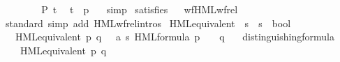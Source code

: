 \begin{isabellebody}
\ \ \ \ \isamarkupfalse%
\isanewline
\ \ \isamarkupfalse%
\ {\isacartoucheopen}P\ t{\isacartoucheclose}\ \isamarkupfalse%
\ {\isacartoucheopen}t\ {\isacharequal}{\kern0pt}\ {\isacharparenleft}{\kern0pt}p{\isacharcomma}{\kern0pt}\ {\isasymphi}{\isacharparenright}{\kern0pt}{\isacartoucheclose}\ \isamarkupfalse%
\ simp\isanewline
{}\isamarkupfalse%
%
\endisatagproof
{\isafoldproof}%
%
\isadelimproof
\isanewline
%
\endisadelimproof
\isanewline
{}\isamarkupfalse%
\ satisfies%
\isadelimproof
\ %
\endisadelimproof
%
\isatagproof
{}\isamarkupfalse%
\ wf{\isacharunderscore}{\kern0pt}HML{\isacharunderscore}{\kern0pt}wf{\isacharunderscore}{\kern0pt}rel\ \isamarkupfalse%
\ {\isacharparenleft}{\kern0pt}standard{\isacharcomma}{\kern0pt}\ {\isacharparenleft}{\kern0pt}simp\ add{\isacharcolon}{\kern0pt}\ HML{\isacharunderscore}{\kern0pt}wf{\isacharunderscore}{\kern0pt}rel{\isachardot}{\kern0pt}intros{\isacharparenright}{\kern0pt}{\isacharplus}{\kern0pt}{\isacharparenright}{\kern0pt}%
\endisatagproof
{\isafoldproof}%
%
\isadelimproof
%
\endisadelimproof
%
\isadelimdocument
%
\endisadelimdocument
%
\isatagdocument
%
\isamarkuptrue%
%
\endisatagdocument
{\isafolddocument}%
%
\isadelimdocument
%
\endisadelimdocument
{}\isamarkupfalse%
\ HML{\isacharunderscore}{\kern0pt}equivalent\ {\isacharcolon}{\kern0pt}{\isacharcolon}{\kern0pt}\ {\isacartoucheopen}{\isacharprime}{\kern0pt}s\ {\isasymRightarrow}\ {\isacharprime}{\kern0pt}s\ {\isasymRightarrow}\ bool{\isacartoucheclose}\isanewline
\ \ \ {\isacartoucheopen}HML{\isacharunderscore}{\kern0pt}equivalent\ p\ q\ {\isasymequiv}\ {\isacharparenleft}{\kern0pt}{\isasymforall}\ {\isasymphi}{\isacharcolon}{\kern0pt}{\isacharcolon}{\kern0pt}{\isacharparenleft}{\kern0pt}{\isacharprime}{\kern0pt}a{\isacharcomma}{\kern0pt}\ {\isacharprime}{\kern0pt}s{\isacharparenright}{\kern0pt}\ HML{\isacharunderscore}{\kern0pt}formula{\isachardot}{\kern0pt}\ {\isacharparenleft}{\kern0pt}p\ {\isasymTurnstile}\ {\isasymphi}{\isacharparenright}{\kern0pt}\ {\isacharequal}{\kern0pt}\ {\isacharparenleft}{\kern0pt}q\ {\isasymTurnstile}\ {\isasymphi}{\isacharparenright}{\kern0pt}{\isacharparenright}{\kern0pt}{\isacartoucheclose}\isanewline
\isanewline
{}\isamarkupfalse%
\ distinguishing{\isacharunderscore}{\kern0pt}formula{\isacharcolon}{\kern0pt}\isanewline
\ \ \ {\isacartoucheopen}{\isasymnot}\ HML{\isacharunderscore}{\kern0pt}equivalent\ p\ q{\isacartoucheclose}\isanewline

\end{isabellebody}
